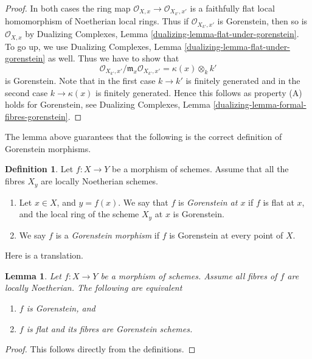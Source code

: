 \documentclass{stacks-project}
\theoremstyle{plain}
\newtheorem{lemma}[subsection]{Lemma}
\theoremstyle{definition}
\newtheorem{definition}[subsection]{Definition}
\theoremstyle{remark}
\numberwithin{equation}{subsection}
\begin{document}
\begin{proof}
In both cases the ring map $\mathcal{O}_{X, x} \to \mathcal{O}_{X_{k'}, x'}$
is a faithfully flat local homomorphism of Noetherian local rings.
Thus if $\mathcal{O}_{X_{k'}, x'}$ is Gorenstein, then so is
$\mathcal{O}_{X, x}$ by
Dualizing Complexes, Lemma \ref{dualizing-lemma-flat-under-gorenstein}.
To go up, we use
Dualizing Complexes, Lemma \ref{dualizing-lemma-flat-under-gorenstein} as well.
Thus we have to show that
$$
\mathcal{O}_{X_{k'}, x'}/\mathfrak m_x \mathcal{O}_{X_{k'}, x'} =
\kappa(x) \otimes_k k'
$$
is Gorenstein. Note that in the first case $k \to k'$ is finitely
generated and in the second case $k \to \kappa(x)$ is finitely
generated. Hence this follows as property (A) holds for
Gorenstein, see Dualizing Complexes, Lemma
\ref{dualizing-lemma-formal-fibres-gorenstein}.
\end{proof}

\noindent
The lemma above guarantees that the following is the correct definition
of Gorenstein morphisms.

\begin{definition}
\label{definition-gorenstein-morphism}
Let $f : X \to Y$ be a morphism of schemes.
Assume that all the fibres $X_y$ are locally Noetherian schemes.
\begin{enumerate}
\item Let $x \in X$, and $y = f(x)$. We say that $f$ is
{\it Gorenstein at $x$} if $f$ is flat at $x$, and the
local ring of the scheme $X_y$ at $x$ is Gorenstein.
\item We say $f$ is a {\it Gorenstein morphism} if $f$ is
Gorenstein at every point of $X$.
\end{enumerate}
\end{definition}

\noindent
Here is a translation.

\begin{lemma}
\label{lemma-gorenstein-morphism}
Let $f : X \to Y$ be a morphism of schemes.
Assume all fibres of $f$ are locally Noetherian.
The following are equivalent
\begin{enumerate}
\item $f$ is Gorenstein, and
\item $f$ is flat and its fibres are Gorenstein schemes.
\end{enumerate}
\end{lemma}

\begin{proof}
This follows directly from the definitions.
\end{proof}
\end{document}

